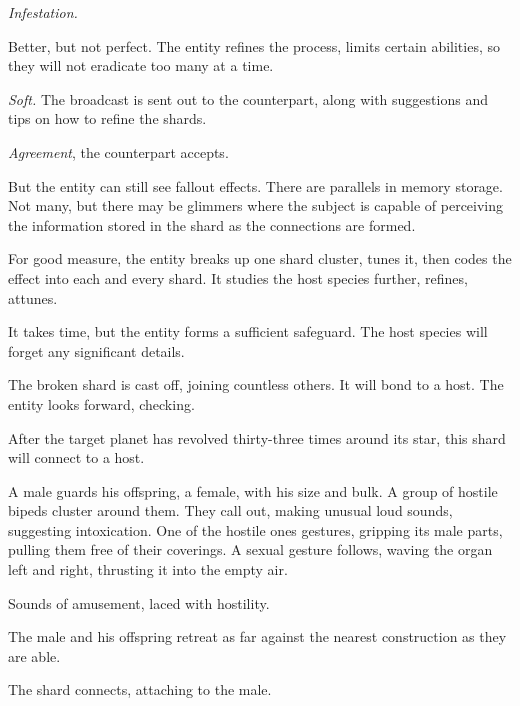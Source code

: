 \emph{Infestation.}



Better, but not perfect.  The entity refines the process, limits certain abilities, so they will not eradicate too many at a time.



\emph{Soft.  }The broadcast is sent out to the counterpart, along with suggestions and tips on how to refine the shards.



\emph{Agreement}, the counterpart accepts.



But the entity can still see fallout effects.  There are parallels in memory storage.  Not many, but there may be glimmers where the subject is capable of perceiving the information stored in the shard as the connections are formed.



For good measure, the entity breaks up one shard cluster, tunes it, then codes the effect into each and every shard.  It studies the host species further, refines, attunes.



It takes time, but the entity forms a sufficient safeguard.  The host species will forget any significant details.



The broken shard is cast off, joining countless others.  It will bond to a host.  The entity looks forward, checking.



After the target planet has revolved thirty-three times around its star, this shard will connect to a host.



A male guards his offspring, a female, with his size and bulk.  A group of hostile bipeds cluster around them.  They call out, making unusual loud sounds, suggesting intoxication.  One of the hostile ones gestures, gripping its male parts, pulling them free of their coverings.  A sexual gesture follows, waving the organ left and right, thrusting it into the empty air.



Sounds of amusement, laced with hostility.



The male and his offspring retreat as far against the nearest construction as they are able.



The shard connects, attaching to the male.




